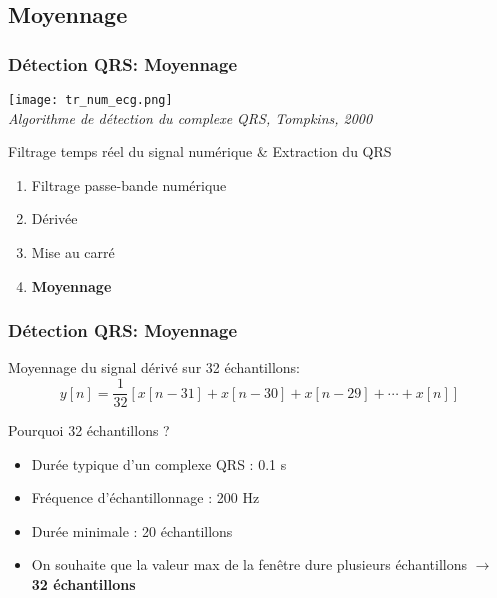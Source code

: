 \documentclass{beamer}
\begin{document}
\subsection{Moyennage}
\begin{frame}
\frametitle{Détection QRS: Moyennage}
\begin{center}
\texttt{[image: tr\_num\_ecg.png]}\\
\textit{\footnotesize Algorithme de détection du complexe QRS, Tompkins, 2000}\\
\vspace{0.3cm}
\end{center}
Filtrage temps réel du signal numérique \& Extraction du QRS
\begin{enumerate}
\item Filtrage passe-bande numérique
\item Dérivée 
\item Mise au carré
\item \textbf{Moyennage}
\end{enumerate}
\end{frame}

\begin{frame}
\frametitle{Détection QRS: Moyennage}
Moyennage du signal dérivé sur 32 échantillons:\\
\vspace{0.2cm}
\[ y[n] = \frac{1}{32} [x[n -31] + x[n-30] + x[n-29] + \cdots +  x[n] ]\]

\vspace{0.4cm}
Pourquoi 32 échantillons ?
\begin{itemize}
\item Durée typique d'un complexe QRS : 0.1 s
\vspace{0.2cm}
\item Fréquence d'échantillonnage : 200 Hz 
\vspace{0.2cm}
\item<2-> Durée minimale : 20 échantillons
\vspace{0.2cm}
\item<3-> On souhaite que la valeur max de la fenêtre dure plusieurs échantillons $\rightarrow $ \textbf{32 échantillons} 
\end{itemize}

\end{frame}
\end{document}
